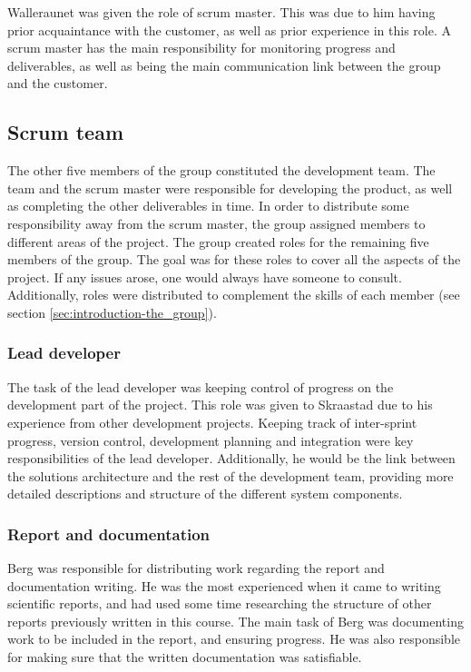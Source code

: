 Walleraunet was given the role of scrum master. This was due to him having prior acquaintance with the customer, as well as prior experience in this role. A scrum master has the main responsibility for monitoring progress and deliverables, as well as being the main communication link between the group and the customer.

\subsection{Scrum team}
\label{subsec:process_and_methodology-project_organization-scrum_team}

The other five members of the group constituted the development team. The team and the scrum master were responsible for developing the product, as well as completing the other deliverables in time. In order to distribute some responsibility away from the scrum master, the group assigned members to different areas of the project. The group created roles for the remaining five members of the group. The goal was for these roles to cover all the aspects of the project. If any issues arose, one would always have someone to consult. Additionally, roles were distributed to complement the skills of each member (see section \ref{sec:introduction-the_group}).

\subsubsection{Lead developer}
\label{subsec:process_and_methodology-project_organization-lead_developer}

The task of the lead developer was keeping control of progress on the development part of the project. This role was given to Skraastad due to his experience from other development projects. Keeping track of inter-sprint progress, version control, development planning and integration were key responsibilities of the lead developer. Additionally, he would be the link between the solutions architecture and the rest of the development team, providing more detailed descriptions and structure of the different system components.

\subsubsection{Report and documentation}
\label{subsec:process_and_methodology-project_organization-report_and_documentation}

Berg was responsible for distributing work regarding the report and documentation writing. He was the most experienced when it came to writing scientific reports, and had used some time researching the structure of other reports previously written in this course. The main task of Berg was documenting work to be included in the report, and ensuring progress. He was also responsible for making sure that the written documentation was satisfiable.


